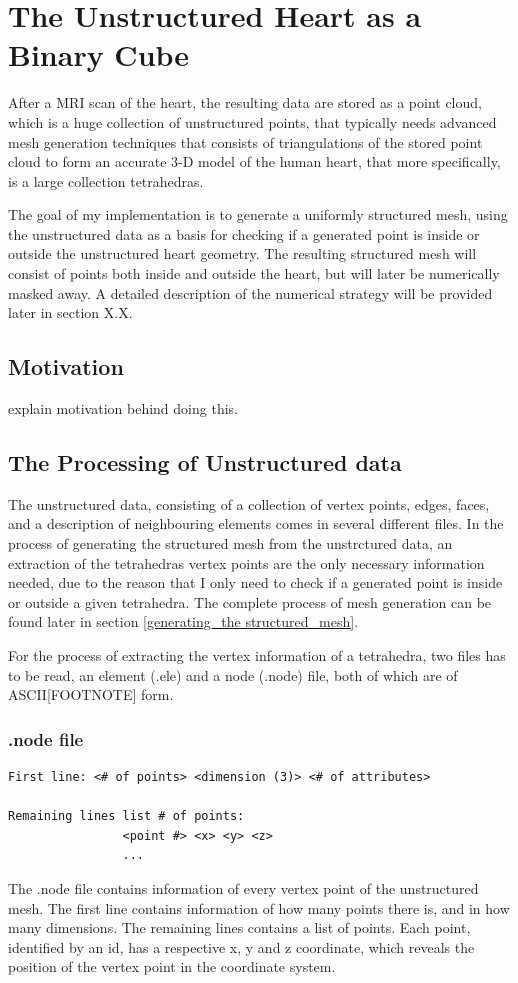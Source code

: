 \chapter{The Unstructured Heart as a Binary Cube} 
After a MRI scan of the heart, the resulting data are stored as a point cloud, which is a huge collection of unstructured points, that typically needs advanced mesh generation techniques that consists of triangulations of the stored point cloud to form an accurate 3-D model of the human heart, that more specifically, is a large collection tetrahedras. 

The goal of my implementation is to generate a uniformly structured mesh, using the unstructured data as a basis for checking if a generated point is inside or outside the unstructured heart geometry. The resulting structured mesh will consist of points both inside and outside the heart, but will later be numerically masked away. A detailed description of the numerical strategy will be provided later in section X.X.

\section{Motivation}
explain motivation behind doing this.

\section{The Processing of Unstructured data}
The unstructured data, consisting of a collection of vertex points, edges, faces, and a description of neighbouring elements comes in several different files. In the process of generating the structured mesh from the unstrctured data, an extraction of the tetrahedras vertex points are the only necessary information needed, due to the reason that I only need to check if a generated point is inside or outside a given tetrahedra. The complete process of mesh generation can be found later in section \ref{generating_the structured_mesh}.

For the process of extracting the vertex information of a tetrahedra, two files has to be read, an element (.ele) and a node (.node) file, both of which are of ASCII[FOOTNOTE] form.

\subsection{.node file}
\begin{lstlisting}[caption=.node file]
First line:	<# of points> <dimension (3)> <# of attributes>

Remaining lines list # of points:
				<point #> <x> <y> <z> 
				...
\end{lstlisting}
The .node file contains information of every vertex point of the unstructured mesh. The first line contains information of how many points there is, and in how many dimensions. The remaining lines contains a list of points. Each point, identified by an id, has a respective x, y and z coordinate, which reveals the position of the vertex point in the coordinate system.

